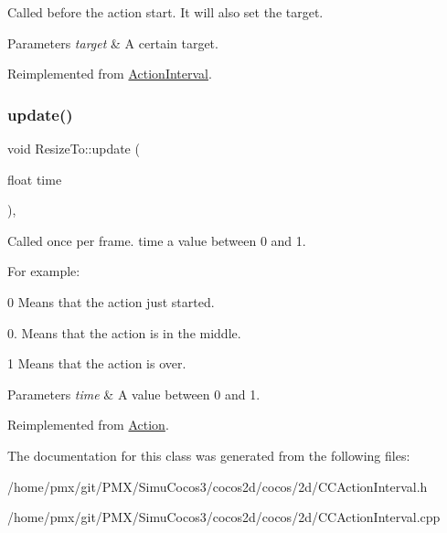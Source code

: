 Called before the action start. It will also set the target.


\begin{DoxyParams}{Parameters}
{\em target} & A certain target. \\
\hline
\end{DoxyParams}


Reimplemented from \hyperlink{classActionInterval_ad3d91186b2c3108488ddbbdbbd982484}{Action\+Interval}.

\mbox{\label{classResizeTo_a081502ef533e7de8e4c53e8e0e7a1412}} 
\subsubsection{\texorpdfstring{update()}{update()}}
{\footnotesize\ttfamily void Resize\+To\+::update (\begin{DoxyParamCaption}\item[{float}]{time }\end{DoxyParamCaption})\hspace{0.3cm}{\ttfamily [override]}, {\ttfamily [virtual]}}

Called once per frame. time a value between 0 and 1.

For example\+:
\begin{DoxyItemize}
\item 0 Means that the action just started.
\item 0. Means that the action is in the middle.
\item 1 Means that the action is over.
\end{DoxyItemize}


\begin{DoxyParams}{Parameters}
{\em time} & A value between 0 and 1. \\
\hline
\end{DoxyParams}


Reimplemented from \hyperlink{classAction_a937e646e63915e33ad05ba149bfcf239}{Action}.



The documentation for this class was generated from the following files\+:\begin{DoxyCompactItemize}
\item 
/home/pmx/git/\+P\+M\+X/\+Simu\+Cocos3/cocos2d/cocos/2d/C\+C\+Action\+Interval.\+h\item 
/home/pmx/git/\+P\+M\+X/\+Simu\+Cocos3/cocos2d/cocos/2d/C\+C\+Action\+Interval.\+cpp\end{DoxyCompactItemize}
